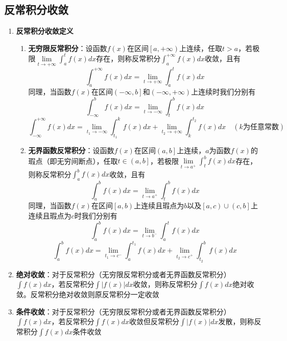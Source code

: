 \documentclass[12pt,a4paper,UTF8]{book}
\begin{document}
\subsection{反常积分收敛}
\begin{enumerate}
\item \textbf{反常积分收敛定义}
\begin{enumerate}
\item \textbf{无穷限反常积分}：设函数$f\left(x\right)$在区间$\left[a,+\infty\right)$上连续，任取$t>a$，若极限$\lim\limits_{t\to+\infty}\int_{a}^{t}f\left(x\right)dx$存在，则称反常积分$\int_{a}^{+\infty}f\left(x\right)dx$收敛，且有
\[\int_{a}^{+\infty}f\left(x\right)dx=\lim\limits_{t\to+\infty}\int_{a}^{t}f\left(x\right)dx\]
同理，当函数$f\left(x\right)$在区间$\left(-\infty,b\right]$和$\left(-\infty,+\infty\right)$上连续时我们分别有
\[\int_{-\infty}^{b}f\left(x\right)dx=\lim\limits_{t\to-\infty}\int_{t}^{b}f\left(x\right)dx\]
\[\int_{-\infty}^{+\infty}f\left(x\right)dx=\lim\limits_{t_1\to-\infty}\int_{t_1}^{k}f\left(x\right)dx+\lim\limits_{t_2\to+\infty}\int_{k}^{t_2}f\left(x\right)dx\quad(k\text{为任意常数})\]
\item \textbf{无界函数反常积分}：设函数$f\left(x\right)$在区间$\left(a,b\right]$上连续，$a$为函数$f\left(x\right)$的瑕点（即无穷间断点），任取$t\in\left(a,b\right]$，若极限$\lim\limits_{t\to a^+}\int_{t}^{b}f\left(x\right)dx$存在，则称反常积分$\int_{a}^{b}f\left(x\right)dx$收敛，且有
\[\int_{a}^{b}f\left(x\right)dx=\lim\limits_{t\to a^+}\int_{t}^{b}f\left(x\right)dx\]
同理，当函数$f\left(x\right)$在区间$\left[a,b\right)$上连续且瑕点为$b$以及$\left[a,c\right)\cup\left(c,b\right]$上连续且瑕点为$c$时我们分别有
\[\int_{a}^{b}f\left(x\right)dx=\lim\limits_{t\to b^-}\int_{a}^{t}f\left(x\right)dx\]
\[\int_{a}^{b}f\left(x\right)dx=\lim\limits_{t_1\to c^-}\int_{a}^{t_1}f\left(x\right)dx+\lim\limits_{t_2\to c^+}\int_{t_2}^{b}f\left(x\right)dx\]
\end{enumerate}
\item \textbf{绝对收敛}：对于反常积分（无穷限反常积分或者无界函数反常积分）$\int f\left(x\right)dx$，若反常积分$\int\left|f\left(x\right)\right|dx$收敛，则称反常积分$\int f\left(x\right)dx$绝对收敛。反常积分绝对收敛则原反常积分一定收敛
\item \textbf{条件收敛}：对于反常积分（无穷限反常积分或者无界函数反常积分）$\int f\left(x\right)dx$，若反常积分$\int f\left(x\right)dx$收敛但反常积分$\int\left|f\left(x\right)\right|dx$发散，则称反常积分$\int f\left(x\right)dx$条件收敛
\end{enumerate}
\end{document}
